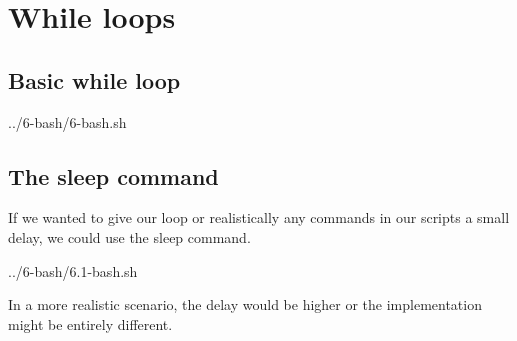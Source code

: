 \chapter{While loops}

\section{Basic while loop}


{../6-bash/6-bash.sh}

\section{The sleep command}

If we wanted to give our loop or realistically any commands in our scripts a small delay,
we could use the sleep command.


{../6-bash/6.1-bash.sh}

In a more realistic scenario, the delay would be higher or the implementation might be entirely
different.